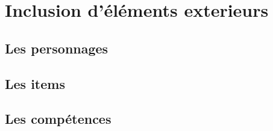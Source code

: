 \chapter{Inclusion d'éléments exterieurs}\label{chapter:inclus}

	\section{Les personnages}

	\section{Les items}

	\section{Les compétences}
